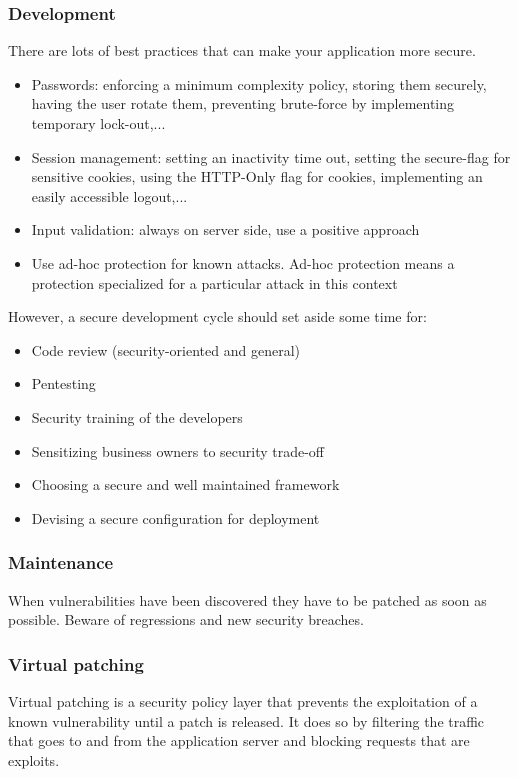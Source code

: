 \subsubsection{Development}
There are lots of best practices that can make your application more secure.
\begin{itemize}
\item Passwords: enforcing a minimum complexity policy, storing them securely,
having the user rotate them, preventing brute-force by implementing temporary
lock-out,...
\item Session management: setting an inactivity time out, setting the
secure-flag for sensitive cookies, using the HTTP-Only flag for cookies,
implementing an easily accessible logout,...
\item Input validation: always on server side, use a positive approach
\item Use ad-hoc protection for known attacks. Ad-hoc protection means a
protection specialized for a particular attack in this context
\end{itemize}

However, a secure development cycle should set aside some time for:
\begin{itemize}
\item Code review (security-oriented and general)
\item Pentesting
\item Security training of the developers
\item Sensitizing business owners to security trade-off
\item Choosing a secure and well maintained framework
\item Devising a secure configuration for deployment
\end{itemize}

\subsubsection{Maintenance}
When vulnerabilities have been discovered they have to be patched as soon as
possible. Beware of regressions and new security breaches.

\subsubsection*{Virtual patching}
Virtual patching is a security policy layer that prevents the exploitation of
a known vulnerability until a patch is released.
It does so by filtering the traffic that goes to and from the application
server and blocking requests that are exploits.

